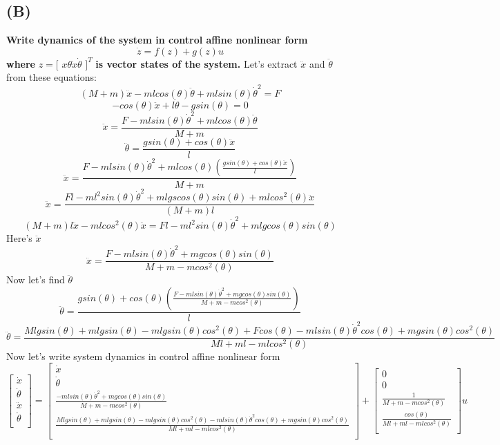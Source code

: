 \documentclass[a4paper,11pt]{article}
\theoremstyle{mytheor}
\begin{document}
\subsection*{(B)} 
\textbf{Write dynamics of the system in control affine nonlinear form} \newline
\[
\dot{z}=f(z)+g(z)u
\]
\textbf{where} $z = [$ $x$\space\space$\theta$\space\space$\dot{x}$\space\space$\dot{\theta}$ $]^{T}$ \textbf{is vector states of the system.}\newline
Let's extract $\ddot{x}$ and $\ddot{\theta}$ from these equations:
\[
(M+m)\ddot{x}-mlcos(\theta)\ddot{\theta}+mlsin(\theta)\dot{\theta}^{2}=F
\]
\[
-cos(\theta)\ddot{x}+l\ddot{\theta}-gsin(\theta)=0
\]
\[
\ddot{x}=\frac{F-mlsin(\theta)\dot{\theta}^{2}+mlcos(\theta)\ddot{\theta}}{M+m}
\]
\[
\ddot{\theta}=\frac{gsin(\theta)+cos(\theta)\ddot{x}}{l}
\]
\[
\ddot{x}=\frac{F-mlsin(\theta)\dot{\theta}^{2}+mlcos(\theta)(\frac{gsin(\theta)+cos(\theta)\ddot{x}}{l})}{M+m}
\]
\[
\ddot{x}=\frac{Fl-ml^{2}sin(\theta)\dot{\theta}^{2}+mlgscos(\theta)sin(\theta)+mlcos^{2}(\theta)\ddot{x}}{(M+m)l}
\]
\[
(M+m)l\ddot{x}-mlcos^{2}(\theta)\ddot{x}=Fl-ml^{2}sin(\theta)\dot{\theta}^{2}+mlgcos(\theta)sin(\theta)
\]
Here's $\ddot{x}$
\[
\ddot{x}=\frac{F-mlsin(\theta)\dot{\theta}^{2}+mgcos(\theta)sin(\theta)}{M+m-mcos^{2}(\theta)}
\]
Now let's find $\ddot{\theta}$
\[
\ddot{\theta}=\frac{gsin(\theta)+cos(\theta)(\frac{F-mlsin(\theta)\dot{\theta}^{2}+mgcos(\theta)sin(\theta)}{M+m-mcos^{2}(\theta)})}{l}
\]
\[
\ddot{\theta}=\frac{Mlgsin(\theta)+mlgsin(\theta)-mlgsin(\theta)cos^{2}(\theta)+Fcos(\theta)-mlsin(\theta)\dot{\theta}^{2}cos(\theta)+mgsin(\theta)cos^{2}(\theta)}{Ml+ml-mlcos^{2}(\theta)}
\]
Now let's write system dynamics in control affine nonlinear form
\[
\begin{bmatrix}
\dot{x}\\
\dot{\theta}\\
\ddot{x}\\
\ddot{\theta}\\
\end{bmatrix}
=
\begin{bmatrix}
\dot{x}\\
\dot{\theta}\\
\frac{-mlsin(\theta)\dot{\theta}^{2}+mgcos(\theta)sin(\theta)}{M+m-mcos^{2}(\theta)}\\
\frac{Mlgsin(\theta)+mlgsin(\theta)-mlgsin(\theta)cos^{2}(\theta)-mlsin(\theta)\dot{\theta}^{2}cos(\theta)+mgsin(\theta)cos^{2}(\theta)}{Ml+ml-mlcos^{2}(\theta)}\\
\end{bmatrix}
+
\begin{bmatrix}
0\\
0\\
\frac{1}{M+m-mcos^{2}(\theta)}\\
\frac{cos(\theta)}{Ml+ml-mlcos^{2}(\theta)}\\
\end{bmatrix}
u
\]
\end{document}
